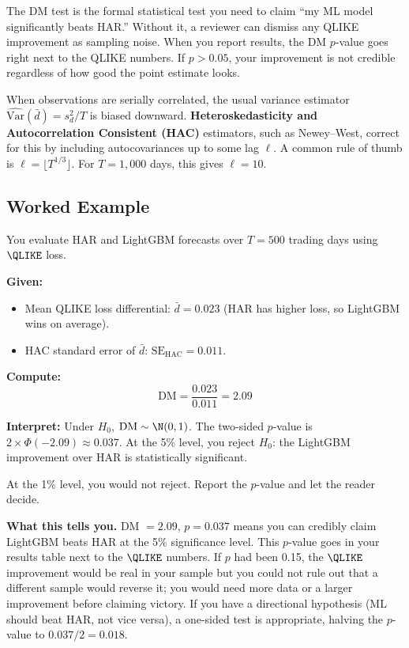 \begin{projectconnection}
The DM test is the formal statistical test you need to claim ``my ML model significantly beats HAR.''
Without it, a reviewer can dismiss any QLIKE improvement as sampling noise.
When you report results, the DM $p$-value goes right next to the QLIKE numbers.
If $p > 0.05$, your improvement is not credible regardless of how good the point estimate looks.
\end{projectconnection}

\begin{prereq}
When observations are serially correlated, the usual variance estimator $\widehat{\text{Var}}(\bar{d}) = s^2_d / T$ is biased downward.
\textbf{Heteroskedasticity and Autocorrelation Consistent (HAC)} estimators, such as Newey--West, correct for this by including autocovariances up to some lag $\ell$.
A common rule of thumb is $\ell = \lfloor T^{1/3} \rfloor$.
For $T = 1{,}000$ days, this gives $\ell = 10$.
\end{prereq}

\subsection{Worked Example}

\begin{workedexample}
You evaluate HAR and LightGBM forecasts over $T = 500$ trading days using $\QLIKE$ loss.

\textbf{Given:}
\begin{itemize}[nosep]
  \item Mean QLIKE loss differential: $\bar{d} = 0.023$ (HAR has higher loss, so LightGBM wins on average).
  \item HAC standard error of $\bar{d}$: $\text{SE}_{\text{HAC}} = 0.011$.
\end{itemize}

\textbf{Compute:}
\[
\text{DM} = \frac{0.023}{0.011} = 2.09
\]

\textbf{Interpret:}
Under $H_0$, $\text{DM} \sim \N(0,1)$.
The two-sided $p$-value is $2 \times \Phi(-2.09) \approx 0.037$.
At the 5\% level, you reject $H_0$: the LightGBM improvement over HAR is statistically significant.

At the 1\% level, you would not reject.
Report the $p$-value and let the reader decide.

\textbf{What this tells you.}
DM $= 2.09$, $p = 0.037$ means you can credibly claim LightGBM beats HAR at the 5\% significance level.
This $p$-value goes in your results table next to the $\QLIKE$ numbers.
If $p$ had been 0.15, the $\QLIKE$ improvement would be real in your sample but you could not rule out that a different sample would reverse it; you would need more data or a larger improvement before claiming victory.
If you have a directional hypothesis (ML should beat HAR, not vice versa), a one-sided test is appropriate, halving the $p$-value to $0.037/2 = 0.018$.
\end{workedexample}

